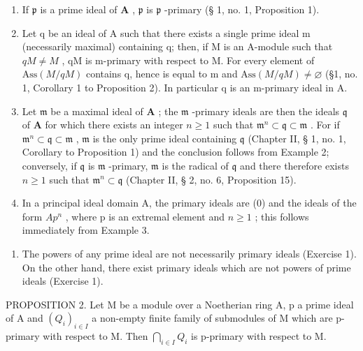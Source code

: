 \begin{enumerate}
\def\labelenumi{(\arabic{enumi})}
\item
  If \(\mathfrak{p}\) is a prime ideal of \(\mathbf{A}\) , \(\mathfrak{p}\) is \(\mathfrak{p}\) -primary (§ 1, no. 1, Proposition 1).
\item
  Let q be an ideal of A such that there exists a single prime ideal m (necessarily maximal) containing q; then, if M is an A-module such that \(qM \neq M\) , qM is m-primary with respect to M. For every element of \(\text{Ass}(M/qM)\) contains q, hence is equal to m and \(\text{Ass}(M/qM) \neq \varnothing\) (§1, no. 1, Corollary 1 to Proposition 2). In particular q is an m-primary ideal in A.
\item
  Let \(\mathfrak{m}\) be a maximal ideal of \(\mathbf{A}\) ; the \(\mathfrak{m}\) -primary ideals are then the ideals \(\mathfrak{q}\) of \(\mathbf{A}\) for which there exists an integer \(n \geqslant 1\) such that \(\mathfrak{m}^n \subset \mathfrak{q} \subset \mathfrak{m}\) . For if \(\mathfrak{m}^n \subset \mathfrak{q} \subset \mathfrak{m}\) , \(\mathfrak{m}\) is the only prime ideal containing \(\mathfrak{q}\) (Chapter II, § 1, no. 1, Corollary to Proposition 1) and the conclusion follows from Example 2; conversely, if \(\mathfrak{q}\) is \(\mathfrak{m}\) -primary, \(\mathfrak{m}\) is the radical of \(\mathfrak{q}\) and there therefore exists \(n \geqslant 1\) such that \(\mathfrak{m}^n \subset \mathfrak{q}\) (Chapter II, § 2, no. 6, Proposition 15).
\item
  In a principal ideal domain A, the primary ideals are (0) and the ideals of the form \(Ap^{n}\) , where p is an extremal element and \(n \geqslant 1\) ; this follows immediately from Example 3.
\end{enumerate}



\begin{enumerate}
\def\labelenumi{(\arabic{enumi})}
\setcounter{enumi}{4}
\tightlist
\item
  The powers of any prime ideal are not necessarily primary ideals (Exercise 1). On the other hand, there exist primary ideals which are not powers of prime ideals (Exercise 1).
\end{enumerate}

PROPOSITION 2. Let M be a module over a Noetherian ring A, p a prime ideal of A and \((Q_{i})_{i\in I}\) a non-empty finite family of submodules of M which are p-primary with respect to M. Then \(\bigcap_{i\in I} Q_{i}\) is p-primary with respect to M.

